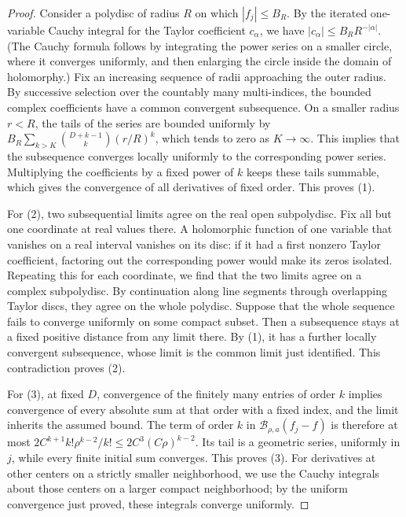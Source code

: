 \begin{proof}
Consider a polydisc of radius $R$ on which $|f_j|\le B_R$. By the iterated one-variable Cauchy integral for the Taylor coefficient $c_\alpha$, we have $|c_\alpha|\le B_RR^{-|\alpha|}$. (The Cauchy formula follows by integrating the power series on a smaller circle, where it converges uniformly, and then enlarging the circle inside the domain of holomorphy.) Fix an increasing sequence of radii approaching the outer radius. By successive selection over the countably many multi-indices, the bounded complex coefficients have a common convergent subsequence. On a smaller radius $r<R$, the tails of the series are bounded uniformly by $B_R\sum_{k>K}\binom{D+k-1}{k}(r/R)^k$, which tends to zero as $K\to\infty$. This implies that the subsequence converges locally uniformly to the corresponding power series. Multiplying the coefficients by a fixed power of $k$ keeps these tails summable, which gives the convergence of all derivatives of fixed order. This proves (1).

For (2), two subsequential limits agree on the real open subpolydisc. Fix all but one coordinate at real values there. A holomorphic function of one variable that vanishes on a real interval vanishes on its disc: if it had a first nonzero Taylor coefficient, factoring out the corresponding power would make its zeros isolated. Repeating this for each coordinate, we find that the two limits agree on a complex subpolydisc. By continuation along line segments through overlapping Taylor discs, they agree on the whole polydisc. Suppose that the whole sequence fails to converge uniformly on some compact subset. Then a subsequence stays at a fixed positive distance from any limit there. By (1), it has a further locally convergent subsequence, whose limit is the common limit just identified. This contradiction proves (2).

For (3), at fixed $D$, convergence of the finitely many entries of order $k$ implies convergence of every absolute sum at that order with a fixed index, and the limit inherits the assumed bound. The term of order $k$ in $\mathcal B_{\rho,a}(f_j-f)$ is therefore at most $2C^{k+1}k!\rho^{k-2}/k!\le2C^3(C\rho)^{k-2}$. Its tail is a geometric series, uniformly in $j$, while every finite initial sum converges. This proves (3). For derivatives at other centers on a strictly smaller neighborhood, we use the Cauchy integrals about those centers on a larger compact neighborhood; by the uniform convergence just proved, these integrals converge uniformly.
\end{proof}

